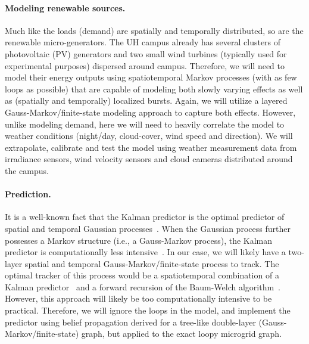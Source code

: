 \paragraph{Modeling renewable sources.} Much like the loads (demand) are
spatially and temporally distributed, so are the renewable
micro-generators. The UH campus already has several clusters of
photovoltaic (PV) generators and two small wind turbines (typically used
for experimental purposes) dispersed around campus. Therefore, we will need
to model their energy outputs using spatiotemporal Markov processes (with
as few loops as possible) that are capable of modeling both slowly varying
effects as well as (spatially and temporally) localized bursts. Again, we
will utilize a layered Gauss-Markov/finite-state modeling approach to
capture both effects.  However, unlike modeling demand, here we will need
to heavily correlate the model to weather conditions (night/day,
cloud-cover, wind speed and direction). We will extrapolate, calibrate and
test the model using weather measurement data from irradiance sensors, wind
velocity sensors and cloud cameras distributed around the campus.


\paragraph{Prediction.} It is a well-known fact that the Kalman predictor
is the optimal predictor of spatial and temporal Gaussian
processes~\cite{Kalman,Kalman_Bucy61,Kailath}. When the Gaussian process
further possesses a Markov structure (i.e., a Gauss-Markov process), the
Kalman predictor is computationally less
intensive~\cite{Kschischang01,Loeliger07}. In our case, we will likely have
a two-layer spatial and temporal Gauss-Markov/finite-state process to
track. The optimal tracker of this process would be a spatiotemporal
combination of a Kalman predictor~\cite{Kalman,Kalman_Bucy61} and a forward
recursion of the Baum-Welch algorithm~\cite{Baum66,Bahl74}. However, this
approach will likely be too computationally intensive to be practical.
Therefore, we will ignore the loops in the model, and implement the
predictor using belief propagation derived for a tree-like double-layer
(Gauss-Markov/finite-state) graph, but applied to the exact loopy microgrid
graph.

